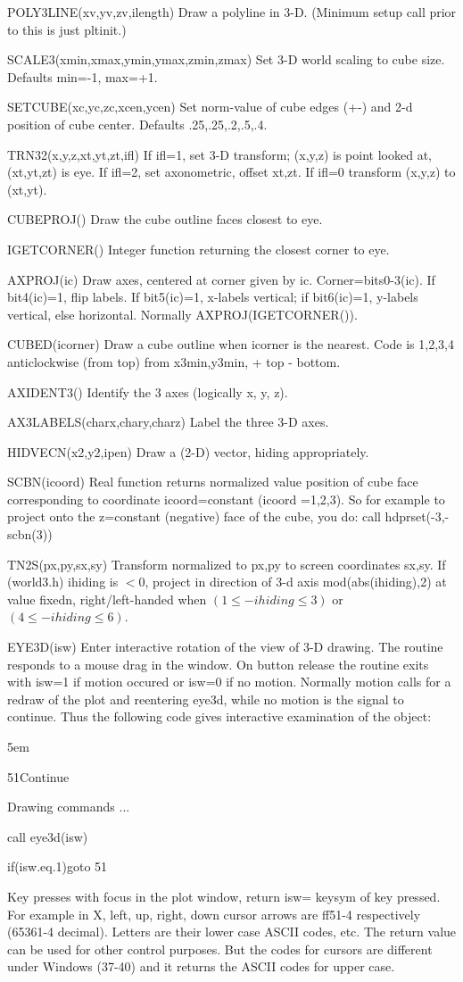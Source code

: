 POLY3LINE(xv,yv,zv,ilength) Draw a polyline in 3-D. (Minimum setup
call prior to this is just pltinit.)

SCALE3(xmin,xmax,ymin,ymax,zmin,zmax) Set 3-D world scaling to cube
size. Defaults min=-1, max=+1.

SETCUBE(xc,yc,zc,xcen,ycen) Set norm-value of cube edges (+-) and 2-d 
position of cube center. Defaults .25,.25,.2,.5,.4.

TRN32(x,y,z,xt,yt,zt,ifl) If ifl=1, set 3-D transform; (x,y,z) is
point looked at, (xt,yt,zt) is eye. If ifl=2, set axonometric, offset
xt,zt.  If ifl=0 transform (x,y,z) to (xt,yt).

CUBEPROJ() Draw the cube outline faces closest to eye.

IGETCORNER() Integer function returning the closest corner to eye.

AXPROJ(ic) Draw axes, centered at corner given by ic.
Corner=bits0-3(ic). If bit4(ic)=1, flip labels.  If bit5(ic)=1,
x-labels vertical; if bit6(ic)=1, y-labels vertical, else horizontal.
Normally AXPROJ(IGETCORNER()).

CUBED(icorner) Draw a cube outline when icorner is the nearest.
Code is 1,2,3,4 anticlockwise (from top) from x3min,y3min, + top - bottom.

AXIDENT3() Identify the 3 axes (logically x, y, z).

AX3LABELS(charx,chary,charz) Label the three 3-D axes.

HIDVECN(x2,y2,ipen) Draw a (2-D) vector, hiding appropriately.

SCBN(icoord) Real function returns normalized value position of cube face
corresponding to coordinate icoord=constant (icoord =1,2,3). So for
example to project onto the z=constant (negative) face of the cube,
you do: call hdprset(-3,-scbn(3))

TN2S(px,py,sx,sy) Transform normalized to px,py to screen coordinates
sx,sy. If (world3.h) ihiding is $<0$, project in direction of 3-d axis
mod(abs(ihiding),2) at value fixedn, right/left-handed when
$(1\le-ihiding\le3 )$ or $(4\le-ihiding\le 6)$.

EYE3D(isw) Enter interactive rotation of the view of 3-D drawing. The
routine responds to a mouse drag in the window. On button release the
routine exits with isw=1 if motion occured or isw=0 if no
motion. Normally motion calls for a redraw of the plot and reentering
eye3d, while no motion is the signal to continue. Thus the following
code gives interactive examination of the object:
{\parindent 5em\parskip 0pt
\item{51}Continue
\item{}Drawing commands ...
\item{}call eye3d(isw)
\item{}if(isw.eq.1)goto 51\par
} Key presses with focus in the plot window, return isw= keysym of key
pressed. For example in X, left, up, right, down cursor arrows are
ff51-4 respectively (65361-4 decimal). Letters are their lower case
ASCII codes, etc.  The return value can be used for other control
purposes. But the codes for cursors are different under Windows
(37-40) and it returns the ASCII codes for upper case.
 
